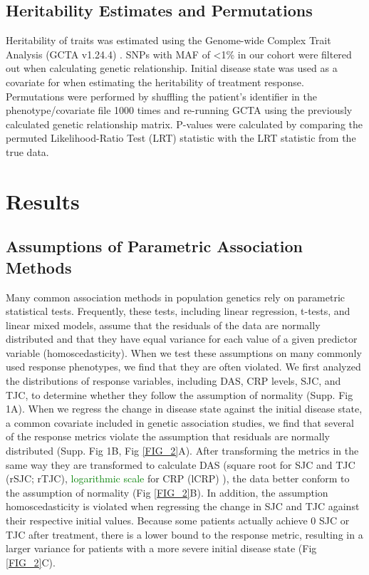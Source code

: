 \subsection*{Heritability Estimates and Permutations}
Heritability of traits was estimated using the Genome-wide Complex Trait Analysis (GCTA v1.24.4) \cite{yang_gcta:_2011}. SNPs with MAF of \textless1\% in our cohort were filtered out when calculating genetic relationship. Initial disease state was used as a covariate for when estimating the heritability of treatment response. Permutations were performed by shuffling the patient's identifier in the phenotype/covariate file 1000 times and re-running GCTA using the previously calculated genetic relationship matrix. P-values were calculated by comparing the permuted Likelihood-Ratio Test (LRT) statistic with the LRT statistic from the true data.

\section*{Results}

\subsection*{Assumptions of Parametric Association Methods}

Many common association methods in population genetics rely on parametric statistical tests. Frequently, these tests, including linear regression, t-tests, and linear mixed models, assume that the residuals of the data are normally distributed and that they have equal variance for each value of a given predictor variable (homoscedasticity). When we test these assumptions on many commonly used response phenotypes, we find that they are often violated. We first analyzed the distributions of response variables, including DAS, CRP levels, SJC, and TJC, to determine whether they follow the assumption of normality (Supp. Fig 1A). When we regress the change in disease state against the initial disease state, a common covariate included in genetic association studies, we find that several of the response metrics violate the assumption that residuals are normally distributed (Supp. Fig 1B, Fig \ref{FIG_2}A). After transforming the metrics in the same way they are transformed to calculate DAS (square root for SJC and TJC (rSJC; rTJC), \textcolor{green}{logarithmic scale} for CRP (lCRP) ), the data better conform to the assumption of normality (Fig \ref{FIG_2}B). In addition, the assumption homoscedasticity is violated when regressing the change in SJC and TJC against their respective initial values. Because some patients actually achieve 0 SJC or TJC after treatment, there is a lower bound to the response metric, resulting in a larger variance for patients with a more severe initial disease state (Fig \ref{FIG_2}C).

